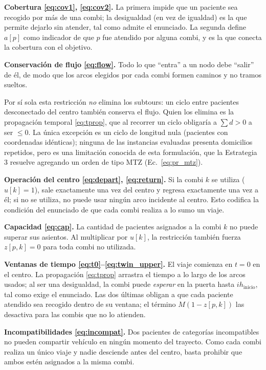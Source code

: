 \documentclass[12pt]{article}
\numberwithin{algorithm}{section}
\begin{document}
\textbf{Cobertura \eqref{eq:cov1}, \eqref{eq:cov2}.} La primera impide que un paciente sea
recogido por más de una combi; la desigualdad (en vez de igualdad) es la que permite dejarlo
sin atender, tal como admite el enunciado. La segunda define $a[p]$ como indicador de que
$p$ fue atendido por alguna combi, y es la que conecta la cobertura con el objetivo.

\textbf{Conservación de flujo \eqref{eq:flow}.} Todo lo que ``entra'' a un nodo debe ``salir''
de él, de modo que los arcos elegidos por cada combi formen caminos y no tramos sueltos.

Por sí sola esta restricción \emph{no} elimina los subtours: un ciclo entre pacientes
desconectado del centro también conserva el flujo. Quien los elimina es la propagación
temporal \eqref{eq:tprop}, que al recorrer un ciclo obligaría a $\sum d > 0$ a ser $\leq 0$.
La única excepción es un ciclo de longitud nula (pacientes con coordenadas idénticas);
ninguna de las instancias evaluadas presenta domicilios repetidos, pero es una limitación
conocida de esta formulación, que la Estrategia 3 resuelve agregando un orden de tipo MTZ
(Ec.~\eqref{eq:pr_mtz}).

\textbf{Operación del centro \eqref{eq:depart}, \eqref{eq:return}.} Si la combi $k$ se
utiliza ($u[k] = 1$), sale exactamente una vez del centro y regresa exactamente una vez a él;
si no se utiliza, no puede usar ningún arco incidente al centro. Esto codifica la condición
del enunciado de que cada combi realiza a lo sumo un viaje.

\textbf{Capacidad \eqref{eq:cap}.} La cantidad de pacientes asignados a la combi $k$ no puede
superar sus asientos. Al multiplicar por $u[k]$, la restricción también fuerza $z[p,k] = 0$
para toda combi no utilizada.

\textbf{Ventanas de tiempo \eqref{eq:t0}--\eqref{eq:twin_upper}.} El viaje comienza en
$t = 0$ en el centro. La propagación \eqref{eq:tprop} arrastra el tiempo a lo largo de los
arcos usados; al ser una desigualdad, la combi puede \emph{esperar} en la puerta hasta
$ih_{\text{inicio}}$, tal como exige el enunciado. Las dos últimas obligan a que cada paciente
atendido sea recogido dentro de su ventana; el término $M(1 - z[p,k])$ las desactiva para las
combis que no lo atienden.

\textbf{Incompatibilidades \eqref{eq:incompat}.} Dos pacientes de categorías incompatibles no
pueden compartir vehículo en ningún momento del trayecto. Como cada combi realiza un único
viaje y nadie desciende antes del centro, basta prohibir que ambos estén asignados a la misma
combi.
\end{document}
